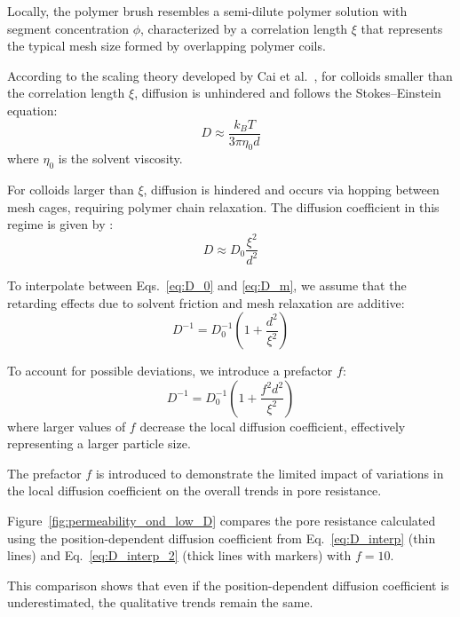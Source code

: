 \documentclass[10pt, a4paper]{article}
\begin{document}
\begin{multicols}{2}
    
Locally, the polymer brush resembles a semi-dilute polymer solution with segment concentration $\phi$, characterized by a correlation length $\xi$ that represents the typical mesh size formed by overlapping polymer coils.

According to the scaling theory developed by Cai et al.\ \cite{ref}, for colloids smaller than the correlation length $\xi$, diffusion is unhindered and follows the Stokes--Einstein equation:
\begin{equation}
D \approx \frac{k_B T}{3 \pi \eta_0 d}
\label{eq:D_0}
\end{equation}
where $\eta_0$ is the solvent viscosity.

For colloids larger than $\xi$, diffusion is hindered and occurs via hopping between mesh cages, requiring polymer chain relaxation. The diffusion coefficient in this regime is given by \cite{ref}:
\begin{equation}
D \approx D_0 \frac{\xi^2}{d^2}
\label{eq:D_m}
\end{equation}

To interpolate between Eqs.~\ref{eq:D_0} and \ref{eq:D_m}, we assume that the retarding effects due to solvent friction and mesh relaxation are additive:
\begin{equation}
D^{-1} = D_0^{-1} \left( 1 + \frac{d^2}{\xi^2} \right)
\label{eq:D_interp}
\end{equation}

To account for possible deviations, we introduce a prefactor $f$:
\begin{equation}
D^{-1} = D_0^{-1} \left( 1 + \frac{f^2 d^2}{\xi^2} \right)
\label{eq:D_interp_2}
\end{equation}
where larger values of $f$ decrease the local diffusion coefficient, effectively representing a larger particle size.

The prefactor $f$ is introduced to demonstrate the limited impact of variations in the local diffusion coefficient on the overall trends in pore resistance.

Figure~\ref{fig:permeability_ond_low_D} compares the pore resistance calculated using the position-dependent diffusion coefficient from Eq.~\ref{eq:D_interp} (thin lines) and Eq.~\ref{eq:D_interp_2} (thick lines with markers) with $f = 10$.

This comparison shows that even if the position-dependent diffusion coefficient is underestimated, the qualitative trends remain the same.


\end{multicols}
\end{document}
